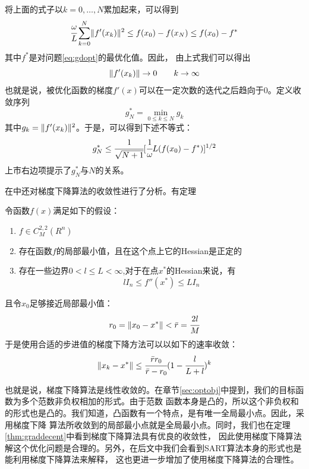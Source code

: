 将上面的式子以$k=0,\hdots,N$累加起来，可以得到
\begin{equation}
\cfrac{\omega}{L}\sum^N_{k=0}\lVert f'(x_k)\rVert^2\le f(x_0)-f(x_N)
\le f(x_0)-f^\ast
\end{equation}
其中$f^\ast$是对问题\eqref{eq:gdopt}的最优化值。因此，
由上式我们可以得出
\begin{equation*}
\lVert f'(x_k)\rVert\rightarrow 0 \qquad k\rightarrow \infty
\end{equation*}
也就是说，被优化函数的梯度$f'(x)$可以在一定次数的迭代之后趋向于$0$。定义收敛序列
\begin{equation*}
g^\ast_N=\min_{0\le k\le N}g_k
\end{equation*}
其中$g_k=\lVert f'(x_k)\rVert^2$。于是，可以得到下述不等式：
\begin{equation}
g^\ast_N \le \cfrac{1}{\sqrt{N+1}}[\cfrac{1}{\omega}L(f(x_0)-f^\ast)]^{1/2}
\end{equation}
上市右边项提示了$g^\ast_N$与$N$的关系。

在\cite{nesterov2003}中还对梯度下降算法的收敛性进行了分析。有定理
\begin{thm}\label{thm:graddecent}
令函数$f(x)$满足如下的假设：
\begin{enumerate}
\item{$f\in C^{2,2}_M(R^n)$}
\item{存在函数$f$的局部最小值，且在这个点上它的Hessian是正定的}
\item{存在一些边界$0<l\le L<\infty$,对于在点$x^\ast$的Hessian来说，有
\begin{equation*}
lI_n\le f''(x^\ast)\le LI_n
\end{equation*}}
\end{enumerate}
且令$x_0$足够接近局部最小值：
\begin{equation*}
r_0=\lVert x_0-x^\ast\rVert<\bar{r}=\cfrac{2l}{M}
\end{equation*}
于是使用合适的步进值的梯度下降方法可以以如下的速率收敛：
\begin{equation*}
\lVert x_k-x^\ast\rVert\le \cfrac{\bar{r}r_0}{\bar{r}-r_0}(1-\cfrac{l}{L+l})^k
\end{equation*}
\end{thm}
也就是说，梯度下降算法是线性收敛的。在章节\ref{sec:optobj}中提到，我们的目标函数为多个范数非负权相加的形式。由于范数
函数本身是凸的，所以这个非负权和的形式也是凸的。我们知道，凸函数有一个特点，是有唯一全局最小点。因此，采用梯度下降
算法所收敛到的局部最小点就是全局最小点。同时，我们也在定理\ref{thm:graddecent}中看到梯度下降算法具有优良的收敛性，
因此使用梯度下降算法解这个优化问题是合理的。另外，在后文中我们会看到SART算法本身的形式也是能利用梯度下降算法来解释，
这也更进一步增加了使用梯度下降算法的合理性。




